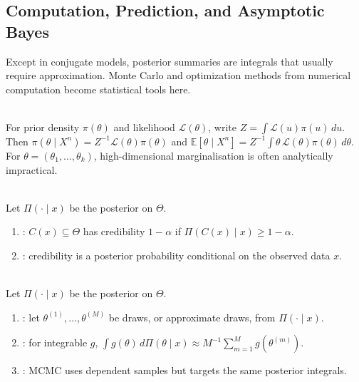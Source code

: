 \subsection{Computation, Prediction, and Asymptotic Bayes}

Except in conjugate models, posterior summaries are integrals that usually require approximation.  Monte Carlo and optimization methods from numerical computation become statistical tools here.

\begin{remark} \label{rem:bayesian-integrals-motivate-simulation} \\
For prior density $\pi(\theta)$ and likelihood $\mathcal{L}(\theta)$, write $Z=\int \mathcal{L}(u)\pi(u)\,du$.\\
Then $\pi(\theta\mid X^n)=Z^{-1}\mathcal{L}(\theta)\pi(\theta)$ and $\mathbb{E}[\theta\mid X^n]=Z^{-1}\int \theta\,\mathcal{L}(\theta)\pi(\theta)\,d\theta$.\\
For $\theta=(\theta_1,\ldots,\theta_k)$, high-dimensional marginalisation is often analytically impractical.
\end{remark}

\begin{definition} \label{def:bayesian-credible-set} \\
Let $\Pi(\cdot\mid x)$ be the posterior on $\Theta$.
\begin{enumerate}[label=(\roman*)]
\setlength{\itemsep}{0pt}
\item {}: $C(x)\subseteq\Theta$ has credibility $1-\alpha$ if $\Pi(C(x)\mid x)\geq1-\alpha$.
\item {}: credibility is a posterior probability conditional on the observed data $x$.
\end{enumerate}
\end{definition}

\begin{definition} \label{def:mcmc-posterior-integration} \\
Let $\Pi(\cdot\mid x)$ be the posterior on $\Theta$.
\begin{enumerate}[label=(\roman*)]
\setlength{\itemsep}{0pt}
\item {}: let $\theta^{(1)},\ldots,\theta^{(M)}$ be draws, or approximate draws, from $\Pi(\cdot\mid x)$.
\item {}: for integrable $g$, $\int g(\theta)\,d\Pi(\theta\mid x)\approx M^{-1}\sum\limits_{m=1}^Mg(\theta^{(m)})$.
\item {}: MCMC uses dependent samples but targets the same posterior integrals.
\end{enumerate}
\end{definition}

